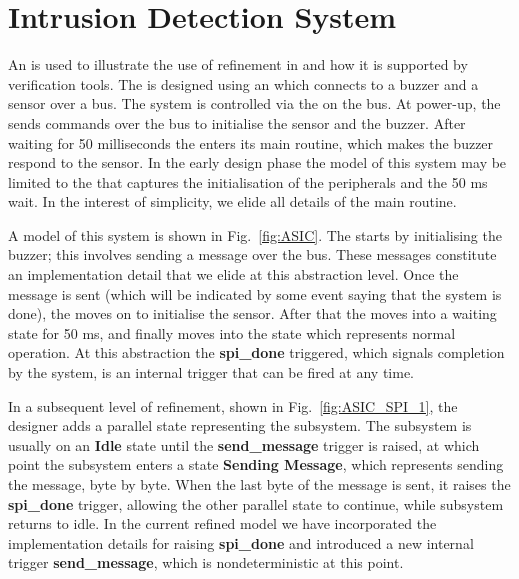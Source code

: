 

\section{Intrusion Detection System}
\label{sec:secbot}

An \IDS is used to illustrate the use of refinement in \statecharts and how it is supported by \EventB verification tools.
The \IDS is designed using an \ASIC which connects to a buzzer and a sensor over a \SPI bus. The system is controlled via the \ASIC on the \SPI bus. At power-up, the \ASIC sends commands over the \SPI bus to initialise the sensor and the buzzer. After waiting for 50 milliseconds the \ASIC enters its main routine, which makes the buzzer respond to the sensor. In the early design phase the \statechart model of this system may be limited to the \ASIC that captures the initialisation of the peripherals and the 50 ms wait. In the interest of simplicity, we elide all details of the main routine.

A \statechart model of this system is shown in Fig.~\ref{fig:ASIC}. The \ASIC starts by initialising the buzzer; this involves sending a message over the \SPI bus. These messages constitute an implementation detail that we elide at this abstraction level. Once the message is sent (which will be indicated by some event saying that the \SPI system is done), the \ASIC moves on to initialise the sensor. After that the \ASIC moves into a waiting state for 50 ms, and finally moves into the state which represents normal operation. At this abstraction the \textbf{spi\_done} triggered, which signals completion by the \SPI system, is an internal trigger that can be fired at any time.

In a subsequent level of refinement, shown in Fig.~\ref{fig:ASIC_SPI_1}, the designer adds a parallel state representing the \SPI subsystem. The \SPI subsystem is usually on an \textbf{Idle} state until the \textbf{send\_message} trigger is raised, at which point the \SPI subsystem enters a state \textbf{Sending Message}, which represents sending the message, byte by byte. When the last byte of the message is sent, it raises the \textbf{spi\_done} trigger, allowing the other parallel state to continue, while \SPI subsystem returns to idle. In the current refined model we have incorporated the implementation details for raising \textbf{spi\_done} and introduced a new internal trigger 
\textbf{send\_message}, which is nondeterministic at this point.

